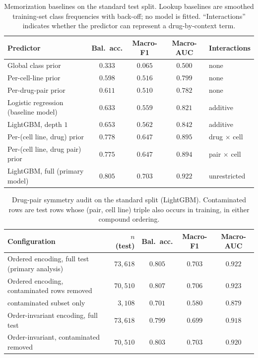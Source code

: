 \documentclass{bmcart}
\begin{document}
\begin{backmatter}
\begin{table}[h!]
\caption{Memorization baselines on the standard test split. Lookup baselines are smoothed training-set
class frequencies with back-off; no model is fitted. ``Interactions'' indicates whether the predictor
can represent a drug-by-context term.}
\label{tab:baselines}
\begin{tabular}{lcccl}
\toprule
Predictor & Bal.\ acc. & Macro-F1 & Macro-AUC & Interactions \\
\midrule
Global class prior                       & $0.333$ & $0.065$ & $0.500$ & none \\
Per-cell-line prior                      & $0.598$ & $0.516$ & $0.799$ & none \\
Per-drug-pair prior                      & $0.611$ & $0.510$ & $0.782$ & none \\
Logistic regression (baseline model)     & $0.633$ & $0.559$ & $0.821$ & additive \\
LightGBM, depth $1$                      & $0.653$ & $0.562$ & $0.842$ & additive \\
Per-(cell line, drug) prior              & $0.778$ & $0.647$ & $0.895$ & drug $\times$ cell \\
Per-(cell line, drug pair) prior         & $0.775$ & $0.647$ & $0.894$ & pair $\times$ cell \\
LightGBM, full (primary model)           & $\mathbf{0.805}$ & $\mathbf{0.703}$ & $\mathbf{0.922}$ & unrestricted \\
\bottomrule
\end{tabular}
\end{table}

\begin{table}[h!]
\caption{Drug-pair symmetry audit on the standard split (LightGBM). Contaminated rows are test rows
whose (pair, cell line) triple also occurs in training, in either compound ordering.}
\label{tab:symmetry}
\begin{tabular}{lrccc}
\toprule
Configuration & $n$ (test) & Bal.\ acc. & Macro-F1 & Macro-AUC \\
\midrule
Ordered encoding, full test (primary analysis) & $73{,}618$ & $0.805$ & $0.703$ & $0.922$ \\
Ordered encoding, contaminated rows removed    & $70{,}510$ & $0.807$ & $0.706$ & $0.923$ \\
\quad contaminated subset only                 & $3{,}108$  & $0.701$ & $0.580$ & $0.879$ \\
Order-invariant encoding, full test            & $73{,}618$ & $0.799$ & $0.699$ & $0.918$ \\
Order-invariant, contaminated removed          & $70{,}510$ & $0.803$ & $0.703$ & $0.920$ \\
\bottomrule
\end{tabular}
\end{table}


\end{backmatter}
\end{document}

